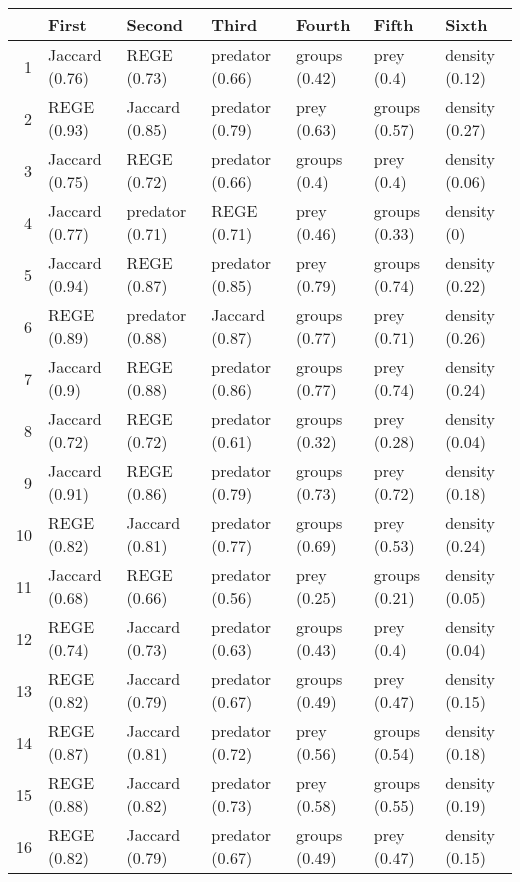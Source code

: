 \begin{table}[ht]
\centering
\begin{tabular}{rllllll}
  \hline
 & First & Second & Third & Fourth & Fifth & Sixth \\ 
  \hline
1 & Jaccard (0.76) & REGE (0.73) & predator (0.66) & groups (0.42) & prey (0.4) & density (0.12) \\ 
  2 & REGE (0.93) & Jaccard (0.85) & predator (0.79) & prey (0.63) & groups (0.57) & density (0.27) \\ 
  3 & Jaccard (0.75) & REGE (0.72) & predator (0.66) & groups (0.4) & prey (0.4) & density (0.06) \\ 
  4 & Jaccard (0.77) & predator (0.71) & REGE (0.71) & prey (0.46) & groups (0.33) & density (0) \\ 
  5 & Jaccard (0.94) & REGE (0.87) & predator (0.85) & prey (0.79) & groups (0.74) & density (0.22) \\ 
  6 & REGE (0.89) & predator (0.88) & Jaccard (0.87) & groups (0.77) & prey (0.71) & density (0.26) \\ 
  7 & Jaccard (0.9) & REGE (0.88) & predator (0.86) & groups (0.77) & prey (0.74) & density (0.24) \\ 
  8 & Jaccard (0.72) & REGE (0.72) & predator (0.61) & groups (0.32) & prey (0.28) & density (0.04) \\ 
  9 & Jaccard (0.91) & REGE (0.86) & predator (0.79) & groups (0.73) & prey (0.72) & density (0.18) \\ 
  10 & REGE (0.82) & Jaccard (0.81) & predator (0.77) & groups (0.69) & prey (0.53) & density (0.24) \\ 
  11 & Jaccard (0.68) & REGE (0.66) & predator (0.56) & prey (0.25) & groups (0.21) & density (0.05) \\ 
  12 & REGE (0.74) & Jaccard (0.73) & predator (0.63) & groups (0.43) & prey (0.4) & density (0.04) \\ 
  13 & REGE (0.82) & Jaccard (0.79) & predator (0.67) & groups (0.49) & prey (0.47) & density (0.15) \\ 
  14 & REGE (0.87) & Jaccard (0.81) & predator (0.72) & prey (0.56) & groups (0.54) & density (0.18) \\ 
  15 & REGE (0.88) & Jaccard (0.82) & predator (0.73) & prey (0.58) & groups (0.55) & density (0.19) \\ 
  16 & REGE (0.82) & Jaccard (0.79) & predator (0.67) & groups (0.49) & prey (0.47) & density (0.15) \\ 

\end{tabular}
\end{table}
